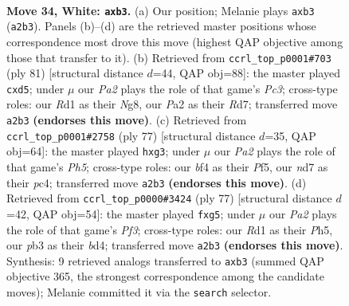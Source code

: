 \documentclass[11pt]{article}
\begin{document}
\clearpage

\begin{figure}[p]\centering
\begin{subfigure}{0.46\textwidth}\centering
\resizebox{\linewidth}{!}{%
\newchessgame
\chessboard[
  setfen={r1k3n1/3n1N2/8/6p1/p3bb1p/1p5P/P4KP1/3R4 w - - 0 34},
  showmover=false,
  pgfstyle=straightmove, color=movearrow, markmove={a2-b3}
]}
\caption{}
\end{subfigure}\hfill
\begin{subfigure}{0.46\textwidth}\centering
\resizebox{\linewidth}{!}{%
\newchessgame
\chessboard[
  setfen={6n1/3r1kb1/2p1p3/3P1p2/2P3p1/4B1P1/2B2P2/1R3K2 b - - 0 41},
  showmover=false,
  pgfstyle=straightmove, color=movearrow, markmove={c6-d5}
]}
\caption{}
\end{subfigure}
\\[4pt]
\begin{subfigure}{0.46\textwidth}\centering
\resizebox{\linewidth}{!}{%
\newchessgame
\chessboard[
  setfen={8/2r3k1/6p1/1B3p2/p1P1nP1p/P5P1/7P/3R2K1 b - - 2 39},
  showmover=false,
  pgfstyle=straightmove, color=movearrow, markmove={h4-g3}
]}
\caption{}
\end{subfigure}\hfill
\begin{subfigure}{0.46\textwidth}\centering
\resizebox{\linewidth}{!}{%
\newchessgame
\chessboard[
  setfen={8/5k2/5p2/p2p2Pp/P2B4/2P2P2/1r2b1P1/R5K1 b - - 0 39},
  showmover=false,
  pgfstyle=straightmove, color=movearrow, markmove={f6-g5}
]}
\caption{}
\end{subfigure}
\caption{\textbf{Move 34, White: \texttt{axb3}.} (a) Our position; Melanie plays \texttt{axb3} (\texttt{a2b3}). Panels (b)--(d) are the retrieved master positions whose correspondence most drove this move (highest QAP objective among those that transfer to it). (b) Retrieved from \texttt{ccrl\_top\_p0001\#703} (ply 81) [structural distance $d$=44, QAP obj=88]: the master played \texttt{cxd5}; under $\mu$ our \emph{Pa2} plays the role of that game's \emph{Pc3}; cross-type roles: our \emph{R}d1 as their \emph{N}g8, our \emph{P}a2 as their \emph{R}d7; transferred move \texttt{a2b3} \textbf{(endorses this move)}. (c) Retrieved from \texttt{ccrl\_top\_p0001\#2758} (ply 77) [structural distance $d$=35, QAP obj=64]: the master played \texttt{hxg3}; under $\mu$ our \emph{Pa2} plays the role of that game's \emph{Ph5}; cross-type roles: our \emph{b}f4 as their \emph{P}f5, our \emph{n}d7 as their \emph{p}c4; transferred move \texttt{a2b3} \textbf{(endorses this move)}. (d) Retrieved from \texttt{ccrl\_top\_p0000\#3424} (ply 77) [structural distance $d$=42, QAP obj=54]: the master played \texttt{fxg5}; under $\mu$ our \emph{Pa2} plays the role of that game's \emph{Pf3}; cross-type roles: our \emph{R}d1 as their \emph{P}h5, our \emph{p}b3 as their \emph{b}d4; transferred move \texttt{a2b3} \textbf{(endorses this move)}. Synthesis: 9 retrieved analogs transferred to \texttt{axb3} (summed QAP objective 365, the strongest correspondence among the candidate moves); Melanie committed it via the \texttt{search} selector.}
\label{fig:thought-m66}
\end{figure}
\end{document}
